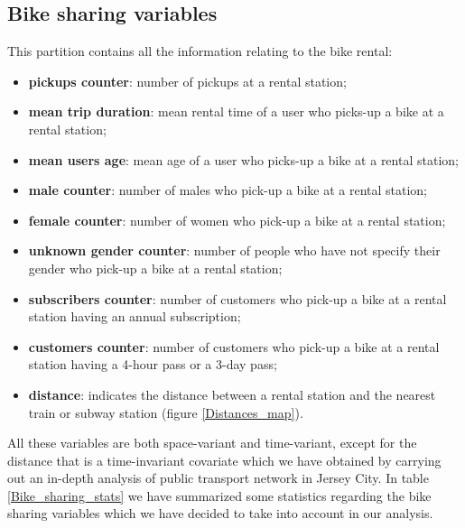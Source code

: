 \subsection{Bike sharing variables}
This partition contains all the information relating to the bike rental: 
\begin{itemize}
	\item \textbf{pickups counter}: number of pickups at a rental station;
	\item \textbf{mean trip duration}: mean rental time of a user who picks-up a bike at a rental station;
	\item \textbf{mean users age}: mean age of a user who picks-up a bike at a rental station;
	\item \textbf{male counter}: number of males who pick-up a bike at a rental station;
	\item \textbf{female counter}: number of women who pick-up a bike at a rental station;
	\item \textbf{unknown gender counter}: number  of people who have not specify their gender who pick-up a bike at a rental station;
	\item \textbf{subscribers counter}: number of customers who pick-up a bike at a rental station having an annual subscription;
	\item \textbf{customers counter}: number of customers who pick-up a bike at a rental station having a \num{4}-hour pass or a \num{3}-day pass;
	\item \textbf{distance}: indicates the distance between a rental station and the nearest train or subway station (figure \ref{Distances_map}).
	
\end{itemize}
All these variables are both space-variant and time-variant, except for the distance that is a time-invariant covariate which we have obtained by carrying out an in-depth analysis of public transport network in Jersey City. In table \ref{Bike_sharing_stats} we have summarized some statistics regarding the bike sharing variables which we have decided to take into account in our analysis.


